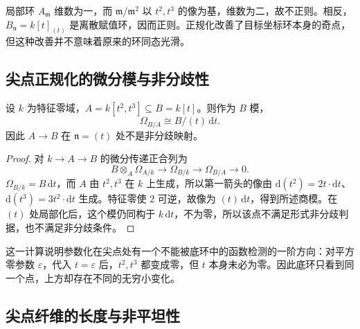 局部环 \(A_{\mathfrak m}\) 维数为一，而 \(\mathfrak m/\mathfrak m^2\) 以 \(t^2,t^3\) 的像为基，维数为二，故不正则。相反，\(B_{\mathfrak n}=k[t]_{(t)}\) 是离散赋值环，因而正则。正规化改善了目标坐标环本身的奇点，但这种改善并不意味着原来的环同态光滑。

\subsection{尖点正规化的微分模与非分歧性}
\label{b3:subsec:2304:04}
\label{b3:subsec:cusp-normalization-differentials}

\begin{proposition}\label{b3:prop:cusp-relative-differentials}
	设 \(k\) 为特征零域，\(A=k[t^2,t^3]\subseteq B=k[t]\)。则作为 \(B\) 模，
	\[
		\Omega_{B/A}\cong B/(t)\,\mathrm{d}t.
	\]
	因此 \(A\to B\) 在 \(\mathfrak n=(t)\) 处不是非分歧映射。
\end{proposition}
\begin{proof}
	对 \(k\to A\to B\) 的微分传递正合列为
	\[
		B\otimes_A\Omega_{A/k}\longrightarrow\Omega_{B/k} \longrightarrow\Omega_{B/A}\longrightarrow0.
	\]
	\(\Omega_{B/k}=B\,\mathrm{d}t\)，而 \(A\) 由 \(t^2,t^3\) 在 \(k\) 上生成，所以第一箭头的像由 \(\mathrm{d}(t^2)=2t\cdot\mathrm{d}t\)、\(\mathrm{d}(t^3)=3t^2\cdot\mathrm{d}t\) 生成。特征零使 \(2\) 可逆，故像为 \((t)\,\mathrm{d}t\)，得到所述商模。在 \((t)\) 处局部化后，这个模仍同构于 \(k\,\mathrm{d}t\)，不为零，所以该点不满足形式非分歧判据，也不满足非分歧条件。
\end{proof}

这一计算说明参数化在尖点处有一个不能被底环中的函数检测的一阶方向：对平方零参数 \(\varepsilon\)，代入 \(t=\varepsilon\) 后，\(t^2,t^3\) 都变成零，但 \(t\) 本身未必为零。因此底环只看到同一个点，上方却存在不同的无穷小变化。

\subsection{尖点纤维的长度与非平坦性}
\label{b3:subsec:2304:05}
\label{b3:subsec:cusp-normalization-fiber}

